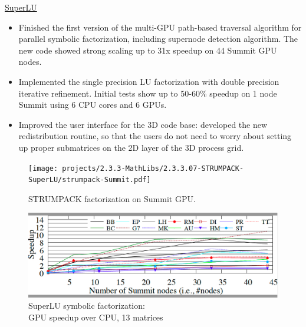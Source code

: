 \underline{SuperLU}
\begin{itemize}
\item Finished the first version of the multi-GPU path-based traversal algorithm for
  parallel symbolic factorization, including supernode detection algorithm. The new code
  showed strong scaling up to 31x speedup on 44 Summit GPU nodes.
\item Implemented the single precision LU factorization with double precision iterative refinement.
  Initial tests show up to 50-60\% speedup on 1 node Summit using 6 CPU cores and 6 GPUs.
\item Improved the user interface for the 3D code base: developed the new redistribution routine,
  so that the users do not need to worry about setting up proper submatrices on the 2D layer
  of the 3D process grid.
\end{itemize}

\vspace{-.3in}
\begin{figure}[htb]
\begin{minipage}[t]{0.48\columnwidth}
\centering
\texttt{[image: projects/2.3.3-MathLibs/2.3.3.07-STRUMPACK-SuperLU/strumpack-Summit.pdf]}
\caption{STRUMPACK factorization on Summit GPU.}
\label{fig:strumpack-parmetis-scaling}
\end{minipage}
\begin{minipage}[t]{0.48\columnwidth}
\centering
\includegraphics[scale=0.2]{projects/2.3.3-MathLibs/2.3.3.07-STRUMPACK-SuperLU/speedup_SOA.jpg}
\caption{SuperLU symbolic factorization: \\ GPU speedup over CPU, 13 matrices}
\label{fig:strumpack-metis-scaling}
\end{minipage}
\end{figure}


